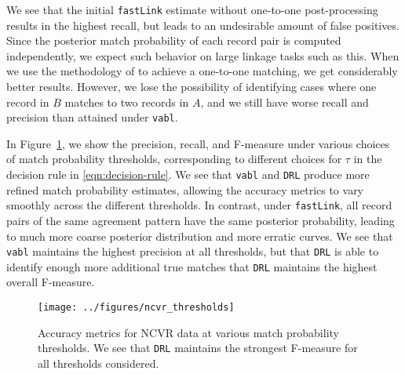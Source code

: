 \documentclass[12pt,letterpaper]{article}
\newcommand{\1}[1]{\mathbb{I}\!\left[#1\right]} %
\begin{document}
We see that the initial \texttt{fastLink} estimate without one-to-one post-processing results in the highest recall, but leads to an undesirable amount of false positives. Since the posterior match probability of each record pair is computed independently, we expect such behavior on large linkage tasks such as this. When we use the methodology of \cite{jaro_1989} to achieve a one-to-one matching, we get considerably better results. However, we lose the possibility of identifying cases where one record in $B$ matches to two records in $A$, and we still have worse recall and precision than attained under \texttt{vabl}. 

In Figure~\ref{fig:ncvr_thresholds}, we show the precision, recall, and F-measure under various choices of match probability thresholds, corresponding to different choices for $\tau$ in the decision rule in \eqref{eqn:decision-rule}. We see that \texttt{vabl} and \texttt{DRL} produce more refined match probability estimates, allowing the accuracy metrics to vary smoothly across the different thresholds. In contrast, under \texttt{fastLink}, all record pairs of the same agreement pattern have the same posterior probability, leading to much more coarse posterior distribution and more erratic curves. We see that \texttt{vabl} maintains the highest precision at all thresholds, but that \texttt{DRL} is able to identify enough more additional true matches that \texttt{DRL} maintains the highest overall F-measure.
\begin{figure}[t]
	\centering
	\texttt{[image: ../figures/ncvr\_thresholds]}
	\caption{Accuracy metrics for NCVR data at various match probability thresholds. We see that \texttt{DRL} maintains the strongest F-measure for all thresholds considered.}
	\label{fig:ncvr_thresholds}
\end{figure}

\end{document}
